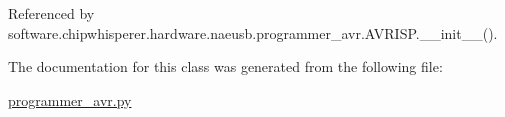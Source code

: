 Referenced by software.\+chipwhisperer.\+hardware.\+naeusb.\+programmer\+\_\+avr.\+A\+V\+R\+I\+S\+P.\+\_\+\+\_\+init\+\_\+\+\_\+().



The documentation for this class was generated from the following file\+:\begin{DoxyCompactItemize}
\item 
\hyperlink{programmer__avr_8py}{programmer\+\_\+avr.\+py}\end{DoxyCompactItemize}
